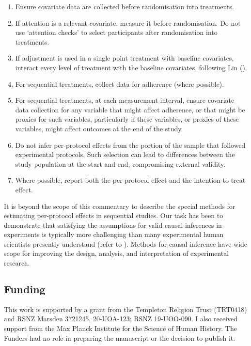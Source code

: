 \documentclass[
  single column]{article}
\providecommand{\tightlist}{%
  \setlength{\itemsep}{0pt}\setlength{\parskip}{0pt}}\usepackage{longtable,booktabs,array}
\begin{document}
\begin{enumerate}
\def\labelenumi{\arabic{enumi}.}
\tightlist
\item
  Ensure covariate data are collected before randomisation into
  treatments.
\item
  If attention is a relevant covariate, measure it before randomisation.
  Do not use `attention checks' to select participants after
  randomisation into treatments.
\item
  If adjustment is used in a single point treatment with baseline
  covariates, interact every level of treatment with the baseline
  covariates, following Lin
  ().
\item
  For sequential treatments, collect data for adherence (where
  possible).
\item
  For sequential treatments, at each measurement interval, ensure
  covariate data collection for any variable that might affect
  adherence, or that might be proxies for such variables, particularly
  if these variables, or proxies of these variables, might affect
  outcomes at the end of the study.
\item
  Do not infer per-protocol effects from the portion of the sample that
  followed experimental protocols. Such selection can lead to
  differences between the study population at the start and end,
  compromising external validity.
\item
  Where possible, report both the per-protocol effect and the
  intention-to-treat effect.
\end{enumerate}

It is beyond the scope of this commentary to describe the special
methods for estimating per-protocol effects in sequential studies. Our
task has been to demonstrate that satisfying the assumptions for valid
causal inferences in experiments is typically more challenging than many
experimental human scientists presently understand (refer to
). Methods
for causal inference have wide scope for improving the design, analysis,
and interpretation of experimental research.

\newpage{}

\subsection{Funding}\label{funding}

This work is supported by a grant from the Templeton Religion Trust
(TRT0418) and RSNZ Marsden 3721245, 20-UOA-123; RSNZ 19-UOO-090. I also
received support from the Max Planck Institute for the Science of Human
History. The Funders had no role in preparing the manuscript or the
decision to publish it.
\end{document}
